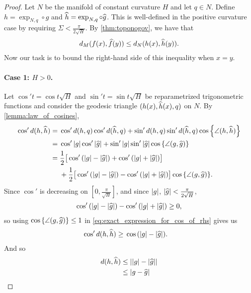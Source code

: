 \documentclass[english, a4paper, 12pt]{article}
\begin{document}
\begin{proof}
	Let $N$ be the manifold of constant curvature $H$ and let $q \in N$.
	Define $h = \operatorname{exp}_{N, q} \circ g$ and $\widehat{h} = \operatorname{exp}_{N, q} \circ \widehat{g}$.
	This is well-defined in the positive curvature case by requiring $\Sigma < \frac{\pi}{2 \sqrt{H}}$.
	By \cref{thm:toponogov}, we have that
	\begin{align}
		d_M(f(x), \widehat{f}(y)) \leq d_N(h(x), \widehat{h}(y)).
	\end{align}
	Now our task is to bound the right-hand side of this inequality when $x = y$.

	\paragraph{Case 1: $H > 0$.}
	Let $\cos'{t} = \cos{t \sqrt{H}}$ and $\sin'{t} = \sin{t \sqrt{H}}$ be reparametrized trigonometric functions and consider the geodesic triangle $(h(x), \widehat{h}(x), q)$ on $N$.
	By \cref{lemma:law_of_cosines},
	\begin{align}
		\cos'{d(h, \mathhat{h})} ={}&
			\cos'{d(h, q)} \cos'{d(\mathhat{h}, q)}
			+ \sin'{d(h, q)} \sin'{d(\mathhat{h}, q)} \cos{\left\{ \angle(h, \mathhat{h}) \right\}}\\
		={}&
			\cos'{\abs{g}} \cos'{\abs{\mathhat{g}}}
			+ \sin'{\abs{g}} \sin'{\abs{\mathhat{g}}} \cos{\left\{ \angle(g, \mathhat{g}) \right\}}\\
		={}& \frac{1}{2} \big[
			\cos'{(\abs{g} - \abs{\mathhat{g}})}
			+ \cos'{(\abs{g} + \abs{\mathhat{g}})}
		\big]\nonumber\\
		&+ \frac{1}{2} \big[
			\cos'{(\abs{g} - \abs{\mathhat{g}})}
			- \cos'{(\abs{g} + \abs{\mathhat{g}})}
		\big] \cos{\left\{ \angle(g, \mathhat{g}) \right\}}.%
		\label{eq:exact_expression_for_cos_of_rhs}
	\end{align}
	Since $\cos'{}$ is decreasing on $[0, \frac{\pi}{\sqrt{H}}]$, and since $\abs{g}$, $\abs{\widehat{g}} < \frac{\pi}{2 \sqrt{H}}$,
	\begin{align}
		\cos'{(\abs{g} - \abs{\widehat{g}})}
		- \cos'{(\abs{g} + \abs{\widehat{g}})} \geq 0,
	\end{align}
	so using $\cos{\left\{ \angle(g, \widehat{g}) \right\}} \leq 1$ in \cref{eq:exact_expression_for_cos_of_rhs} gives us
	\begin{align}
		\cos'{d(h, \widehat{h})} \geq{}& \cos{(\abs{g} - \abs{\widehat{g}})}.
	\end{align}
	And so
	\begin{align}
		d(h, \widehat{h}) \leq{}& \abs{\abs{g} - \abs{\widehat{g}}}\\
		\leq{}& \abs{g - \widehat{g}}
	\end{align}
	

\end{proof}
\end{document}
